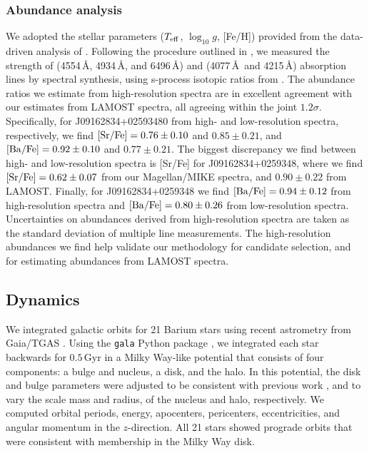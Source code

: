 \documentclass[a4paper,fleqn,usenatbib]{mnras}
\begin{document}
\subsubsection{Abundance analysis}
We adopted the stellar parameters ($T_{\rm eff}$, $\log_{10}g$, [Fe/H]) provided from the data-driven analysis of \citep{ho2017}. Following the procedure outlined in \citep{casey2014}, we measured the strength of  (4554\,\AA, 4934\,\AA, and 6496\,\AA) and  (4077\,\AA\ and 4215\,\AA) absorption lines by spectral synthesis, using s-process isotopic ratios from \citet{sneden08}. The abundance ratios we estimate from high-resolution spectra are in excellent agreement with our estimates from LAMOST spectra, all agreeing within the joint $1.2\sigma$. Specifically, for J09162834+02593480 from high- and low-resolution spectra, respectively, we find $[{\rm Sr/Fe}] = 0.76 \pm 0.10$ and $0.85 \pm 0.21$, and $[{\rm Ba/Fe}] = 0.92 \pm 0.10$ and $0.77 \pm 0.21$. The biggest discrepancy we find between high- and low-resolution spectra is [Sr/Fe] for J09162834+0259348, where we find $[{\rm Sr/Fe}] = 0.62 \pm 0.07$ from our Magellan/MIKE spectra, and $0.90 \pm 0.22$ from LAMOST. Finally, for J09162834+0259348 we find $[{\rm Ba/Fe}] = 0.94 \pm 0.12$ from high-resolution spectra and $[{\rm Ba/Fe}] = 0.80 \pm 0.26$ from low-resolution spectra. Uncertainties on abundances derived from high-resolution spectra are taken as the standard deviation of multiple line measurements. The high-resolution abundances we find help validate our methodology for candidate selection, and for estimating abundances from LAMOST spectra.


\subsection{Dynamics}
We integrated galactic orbits for 21 Barium stars using recent astrometry from Gaia/TGAS \citep{gaia2016a,gaia2016b}. Using the \texttt{gala} Python package \citep{price2017}, we integrated each star backwards for $0.5\,\textrm{Gyr}$ in a Milky Way-like potential that consists of four components: a \citet{hernquist1990} bulge and nucleus, a \citet{miyamoto1975} disk, and the \citet{nfw1997} halo. In this potential, the disk and bulge parameters were adjusted to be consistent with previous work \citep{bovy2015}, and to vary the scale mass and radius, of the nucleus and halo, respectively. We computed orbital periods, energy, apocenters, pericenters, eccentricities, and angular momentum in the $z$-direction. All 21 stars showed prograde orbits that were consistent with membership in the Milky Way disk.
\end{document}
